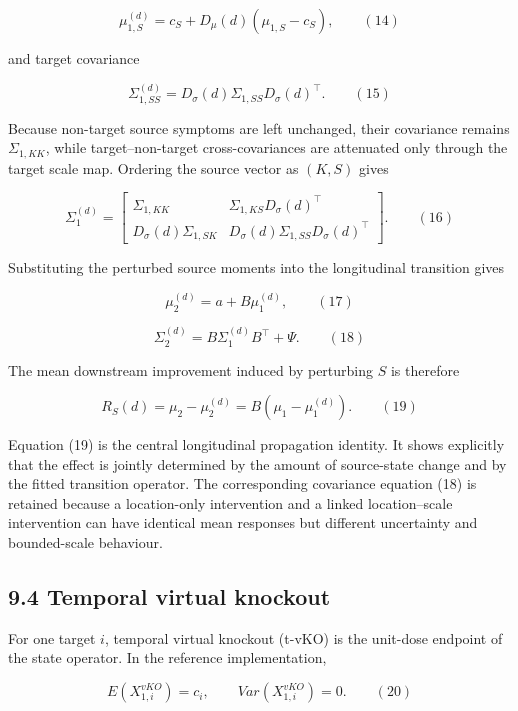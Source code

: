 \documentclass[11pt]{article}
\begin{document}
\[\mu_{1,S}^{(d)} = c_{S} + D_{\mu}(d)\left( \mu_{1,S} - c_{S} \right),\quad\quad(14)\]

and target covariance

\[\Sigma_{1,SS}^{(d)} = D_{\sigma}(d)\Sigma_{1,SS}D_{\sigma}(d)^{\top}.\quad\quad(15)\]

Because non-target source symptoms are left unchanged, their covariance
remains \(\Sigma_{1,KK}\), while target--non-target cross-covariances
are attenuated only through the target scale map. Ordering the source
vector as \((K,S)\) gives

\[\Sigma_{1}^{(d)} = \begin{bmatrix}
\Sigma_{1,KK} & \Sigma_{1,KS}D_{\sigma}(d)^{\top} \\
D_{\sigma}(d)\Sigma_{1,SK} & D_{\sigma}(d)\Sigma_{1,SS}D_{\sigma}(d)^{\top}
\end{bmatrix}.\quad\quad(16)\]

Substituting the perturbed source moments into the longitudinal
transition gives

\[\mu_{2}^{(d)} = a + B\mu_{1}^{(d)},\quad\quad(17)\]

\[\Sigma_{2}^{(d)} = B\Sigma_{1}^{(d)}B^{\top} + \Psi.\quad\quad(18)\]

The mean downstream improvement induced by perturbing \(S\) is therefore

\[R_{S}(d) = \mu_{2} - \mu_{2}^{(d)} = B\left( \mu_{1} - \mu_{1}^{(d)} \right).\quad\quad(19)\]

Equation (19) is the central longitudinal propagation identity. It shows
explicitly that the effect is jointly determined by the amount of
source-state change and by the fitted transition operator. The
corresponding covariance equation (18) is retained because a
location-only intervention and a linked location--scale intervention can
have identical mean responses but different uncertainty and
bounded-scale behaviour.

\subsection{9.4 Temporal virtual
knockout}\label{temporal-virtual-knockout}

For one target \(i\), temporal virtual knockout (t-vKO) is the unit-dose
endpoint of the state operator. In the reference implementation,

\[E\left( X_{1,i}^{vKO} \right) = c_{i},\quad\quad Var\left( X_{1,i}^{vKO} \right) = 0.\quad\quad(20)\]
\end{document}
